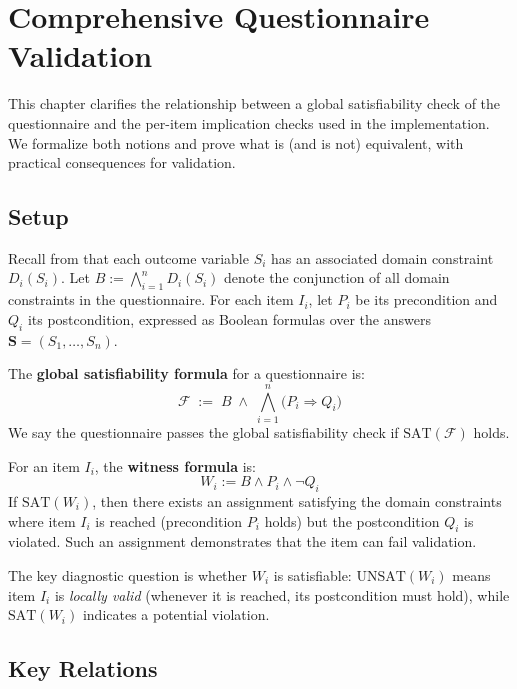 \chapter{Comprehensive Questionnaire Validation}
\label{ch:comprehensive}

This chapter clarifies the relationship between a global satisfiability check of the questionnaire and the per-item implication checks used in the implementation. We formalize both notions and prove what is (and is not) equivalent, with practical consequences for validation.

\section{Setup}

Recall from  that each outcome variable $S_i$ has an associated domain constraint $D_i(S_i)$. Let $B := \bigwedge_{i=1}^n D_i(S_i)$ denote the conjunction of all domain constraints in the questionnaire. For each item $I_i$, let $P_i$ be its precondition and $Q_i$ its postcondition, expressed as Boolean formulas over the answers $\mathbf{S} = (S_1,\dots,S_n)$.

\begin{definition}
\label{def:global-formula}
The \textbf{global satisfiability formula} for a questionnaire is:
\[
  \mathcal{F} \;:=\; B \;\wedge\; \bigwedge_{i=1}^n \bigl(P_i \Rightarrow Q_i\bigr)
\]
We say the questionnaire passes the global satisfiability check if $\mathrm{SAT}(\mathcal{F})$ holds.
\end{definition}

\begin{definition}
\label{def:witness-formula}
For an item $I_i$, the \textbf{witness formula} is:
\[
  W_i := B \wedge P_i \wedge \lnot Q_i
\]
If $\mathrm{SAT}(W_i)$, then there exists an assignment satisfying the domain constraints where item $I_i$ is reached (precondition $P_i$ holds) but the postcondition $Q_i$ is violated. Such an assignment demonstrates that the item can fail validation.
\end{definition}

The key diagnostic question is whether $W_i$ is satisfiable: $\mathrm{UNSAT}(W_i)$ means item $I_i$ is \emph{locally valid} (whenever it is reached, its postcondition must hold), while $\mathrm{SAT}(W_i)$ indicates a potential violation.

\section{Key Relations}

